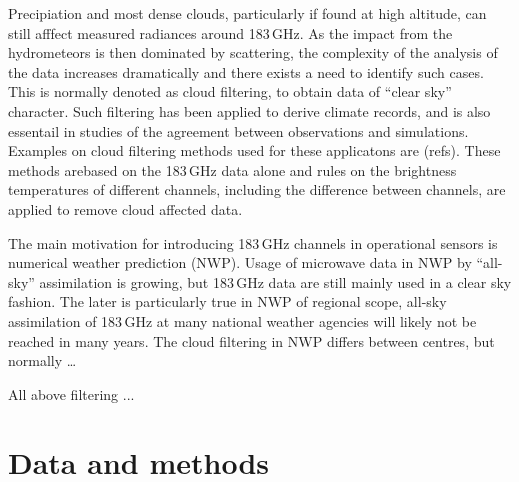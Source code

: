\documentclass[amt, manuscript]{copernicus}
\newcommand{\todo}[1]{{\color{red} #1}}
\begin{document}
Precipiation and most dense clouds, particularly if found at high altitude, can
still afffect measured radiances around 183\,GHz. As the impact from the
hydrometeors is then dominated by scattering, the complexity of the analysis of
the data increases dramatically and there exists a need to identify such cases.
This is normally denoted as cloud filtering, to obtain data of ``clear sky''
character. Such filtering has been applied to derive climate records, and is
also essentail in studies of the agreement between observations and
simulations. Examples on cloud filtering methods used for these applicatons are
\todo{(refs)}. These methods arebased on the 183\,GHz data alone and rules on
the brightness temperatures of different channels, including the difference
between channels, are applied to remove cloud affected data.

The main motivation for introducing 183\,GHz channels in operational sensors is
numerical weather prediction (NWP). Usage of microwave data in NWP by
``all-sky'' assimilation is growing, but 183\,GHz data are still mainly used in
a clear sky fashion. The later is particularly true in NWP of regional scope,
all-sky assimilation of 183\,GHz at many national weather agencies will likely
not be reached in many years. The cloud filtering in NWP differs between
centres, but normally \dots





All above filtering ...




\section{Data and methods}
\end{document}

